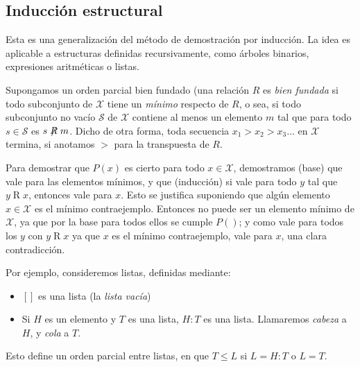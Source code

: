 \subsection{Inducción estructural}
\label{sec:induccion-estructural}

  Esta es una generalización
  del método de demostración por inducción.
  La idea es aplicable a estructuras definidas recursivamente,
  como árboles binarios,
  expresiones aritméticas
  o listas.

  Supongamos un orden parcial bien fundado%
  (una relación \(R\) es \emph{bien fundada}
   si todo subconjunto de \(\mathcal{X}\)
   tiene un \emph{mínimo} respecto de \(R\),
   o sea,
   si todo subconjunto no vacío \(\mathcal{S}\) de \(\mathcal{X}\)
   contiene al menos un elemento \(m\)
   tal que para todo \(s \in \mathcal{S}\)
   es \(s \not\mathrel{R} m\).
  Dicho de otra forma,
  toda secuencia \(x_1 > x_2 > x_3 \dotso\)
  en \(\mathcal{X}\) termina,
  si anotamos \(>\)
  para la transpuesta
  de \(R\).

  Para demostrar que \(P(x)\) es cierto
  para todo \(x \in \mathcal{X}\),
  demostramos (base) que vale para las elementos mínimos,
  y que (inducción) si vale para todo \(y\)
  tal que \(y \mathrel{R} x\),
  entonces vale para \(x\).
  Esto se justifica
  suponiendo que algún elemento \(x \in	 \mathcal{X}\)
  es el mínimo contraejemplo.
  Entonces no puede ser un elemento mínimo de \(\mathcal{X}\),
  ya que por la base para todos ellos se cumple \(P()\);
  y como vale para todos los \(y\) con \(y \mathrel{R} x\)
  ya que \(x\) es el mínimo contraejemplo,
  vale para \(x\),
  una clara contradicción.

  Por ejemplo,
  consideremos listas,
  definidas mediante:
  \begin{itemize}
  \item
    \([]\) es una lista
    (la \emph{lista vacía})
   \item
     Si \(H\) es un elemento
     y \(T\) es una lista,
     \(H : T\) es una lista.
     Llamaremos \emph{cabeza} a \(H\),
     y \emph{cola} a \(T\).
  \end{itemize}
  Esto define un orden parcial entre listas,
  en que \(T \le L\)
  si \(L = H : T\) o \(L = T\).

